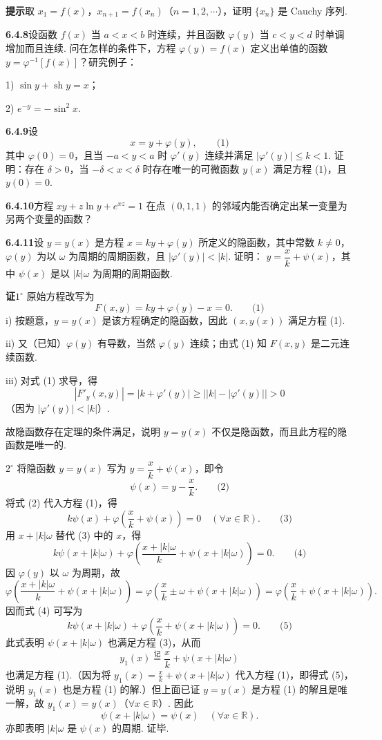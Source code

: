 \documentclass[UTF8, 12pt, fontset=fandol, oneside]{ctexart}
\begin{document}
\noindent\textbf{提示}\quad 取 $x_1=f(x)$，$x_{n+1}=f(x_n)$（$n=1,2,\cdots$），证明 $\{x_n\}$ 是 Cauchy 序列.

\noindent\textbf{6.4.8}\quad 设函数 $f(x)$ 当 $a<x<b$ 时连续，并且函数 $\varphi(y)$ 当 $c<y<d$ 时单调增加而且连续. 问在怎样的条件下，方程 $\varphi(y)=f(x)$ 定义出单值的函数
$y=\varphi^{-1}[f(x)]$？研究例子：

1) $\sin y+\operatorname{sh} y=x$；

2) $e^{-y}=-\sin^2x$.

\noindent\textbf{6.4.9}\quad 设
\[
  x=y+\varphi(y), \qquad\text{(1)}
\]
其中 $\varphi(0)=0$，且当 $-a<y<a$ 时 $\varphi'(y)$ 连续并满足
$|\varphi'(y)|\le k<1$. 证明：存在 $\delta>0$，当 $-\delta<x<\delta$ 时存在唯一的可微函数 $y(x)$ 满足方程 (1)，且 $y(0)=0$.

\noindent\textbf{6.4.10}\quad 方程 $xy+z\ln y+e^{xz}=1$ 在点 $(0,1,1)$ 的邻域内能否确定出某一变量为另两个变量的函数？

\noindent\textbf{6.4.11}\quad 设 $y=y(x)$ 是方程 $x=ky+\varphi(y)$ 所定义的隐函数，其中常数 $k\ne0$，$\varphi(y)$ 为以 $\omega$ 为周期的周期函数，且 $|\varphi'(y)|<|k|$. 证明：
$y=\dfrac{x}{k}+\psi(x)$，其中 $\psi(x)$ 是以 $|k|\omega$ 为周期的周期函数.

\noindent\textbf{证}\quad $1^\circ$ 原始方程改写为
\[
  F(x,y)=ky+\varphi(y)-x=0. \qquad\text{(1)}
\]
i) 按题意，$y=y(x)$ 是该方程确定的隐函数，因此 $(x,y(x))$ 满足方程 (1).

ii) 又（已知）$\varphi(y)$ 有导数，当然 $\varphi(y)$ 连续；由式 (1) 知 $F(x,y)$ 是二元连续函数.

iii) 对式 (1) 求导，得
\[
  |F'_y(x,y)|=|k+\varphi'(y)|\ge \bigl||k|-|\varphi'(y)|\bigr|>0
\]
（因为 $|\varphi'(y)|<|k|$）.

故隐函数存在定理的条件满足，说明 $y=y(x)$ 不仅是隐函数，而且此方程的隐函数是唯一的.

$2^\circ$ 将隐函数 $y=y(x)$ 写为 $y=\dfrac{x}{k}+\psi(x)$，即令
\[
  \psi(x)=y-\frac{x}{k}. \qquad\text{(2)}
\]
将式 (2) 代入方程 (1)，得
\[
  k\psi(x)+\varphi\left(\frac{x}{k}+\psi(x)\right)=0\quad(\forall x\in\mathbb R). \qquad\text{(3)}
\]
用 $x+|k|\omega$ 替代 (3) 中的 $x$，得
\[
  k\psi(x+|k|\omega)
  +\varphi\left(\frac{x+|k|\omega}{k}+\psi(x+|k|\omega)\right)=0. \qquad\text{(4)}
\]
因 $\varphi(y)$ 以 $\omega$ 为周期，故
\[
  \varphi\left(\frac{x+|k|\omega}{k}+\psi(x+|k|\omega)\right)
  =
  \varphi\left(\frac{x}{k}\pm\omega+\psi(x+|k|\omega)\right)
  =
  \varphi\left(\frac{x}{k}+\psi(x+|k|\omega)\right).
\]
因而式 (4) 可写为
\[
  k\psi(x+|k|\omega)
  +\varphi\left(\frac{x}{k}+\psi(x+|k|\omega)\right)=0. \qquad\text{(5)}
\]
此式表明 $\psi(x+|k|\omega)$ 也满足方程 (3)，从而
\[
  y_1(x)\overset{\text{记}}{=}\frac{x}{k}+\psi(x+|k|\omega)
\]
也满足方程 (1).（因为将 $y_1(x)=\frac{x}{k}+\psi(x+|k|\omega)$ 代入方程 (1)，即得式 (5)，说明 $y_1(x)$ 也是方程 (1) 的解.）但上面已证 $y=y(x)$ 是方程 (1) 的解且是唯一解，故
$y_1(x)=y(x)$（$\forall x\in\mathbb R$）. 因此
\[
  \psi(x+|k|\omega)=\psi(x)\quad(\forall x\in\mathbb R).
\]
亦即表明 $|k|\omega$ 是 $\psi(x)$ 的周期. 证毕.
\end{document}

